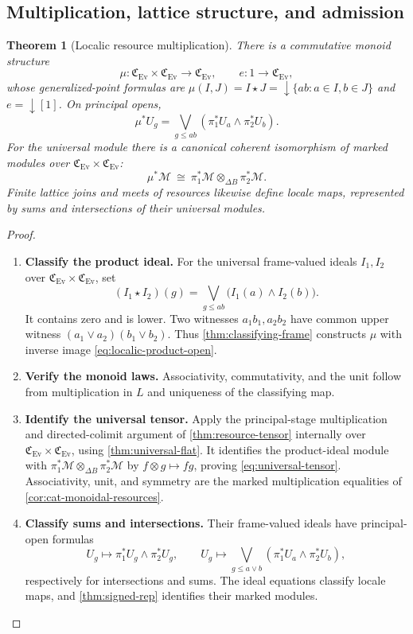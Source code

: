 \documentclass[11pt,a4paper]{article}
\numberwithin{algorithm}{section}
\numberwithin{equation}{section}
\newtheorem{theorem}{Theorem}[section]
\theoremstyle{definition}
\theoremstyle{remark}
\theoremstyle{plain}
\newcommand{\Ev}{{\operatorname{Ev}}}
\newcommand{\Cplx}{\mathfrak C_{\Ev}}
\theoremstyle{definition}
\theoremstyle{plain}
\begin{document}
\subsection{Multiplication, lattice structure, and admission}
\begin{theorem}[Localic resource multiplication]
\label{thm:localic-multiplication}
There is a commutative monoid structure
\[
 \mu:\Cplx\times\Cplx\to\Cplx,
 \qquad e:1\to\Cplx,
\]
whose generalized-point formulas are
$\mu(I,J)=I\star J=\downarrow\{ab:a\in I,b\in J\}$ and
$e=\downarrow[1]$. On principal opens,
\begin{equation}\label{eq:localic-product-open}
 \mu^*U_g
 =\bigvee_{g\le ab}
    (\pi_1^*U_a\wedge\pi_2^*U_b).
\end{equation}
For the universal module there is a canonical coherent
isomorphism of marked modules over $\Cplx\times\Cplx$:
\begin{equation}\label{eq:universal-tensor}
 \mu^*\mathscr M
 \ \cong\ \pi_1^*\mathscr M
     \otimes_{\Delta B}\pi_2^*\mathscr M.
\end{equation}
Finite lattice joins and meets of resources likewise define
locale maps, represented by sums and intersections of their
universal modules.
\end{theorem}
\begin{proof}\leavevmode
\begin{enumerate}[leftmargin=*,align=left]
\item \textbf{Classify the product ideal.}
For the universal frame-valued ideals $I_1,I_2$ over
$\Cplx\times\Cplx$, set
\[
 (I_1\star I_2)(g)=
 \bigvee_{g\le ab}\bigl(I_1(a)\wedge I_2(b)\bigr).
\]
It contains zero and is lower. Two witnesses $a_1b_1,a_2b_2$
have common upper witness $(a_1\vee a_2)(b_1\vee b_2)$.
Thus \cref{thm:classifying-frame} constructs $\mu$ with
inverse image \eqref{eq:localic-product-open}.

\item \textbf{Verify the monoid laws.}
Associativity, commutativity, and the unit follow from multiplication
in $L$ and uniqueness of the classifying map.

\item \textbf{Identify the universal tensor.}
Apply the principal-stage multiplication and directed-colimit
argument of \cref{thm:resource-tensor} internally over
$\Cplx\times\Cplx$, using \cref{thm:universal-flat}.
It identifies the product-ideal module with
$\pi_1^*\mathscr M\otimes_{\Delta B}\pi_2^*\mathscr M$
by $f\otimes g\mapsto fg$, proving \eqref{eq:universal-tensor}.
Associativity, unit, and symmetry are the marked multiplication
equalities of \cref{cor:cat-monoidal-resources}.

\item \textbf{Classify sums and intersections.}
Their frame-valued ideals have principal-open formulas
\[
 U_g\longmapsto\pi_1^*U_g\wedge\pi_2^*U_g,
 \qquad
 U_g\longmapsto\bigvee_{g\le a\vee b}
       (\pi_1^*U_a\wedge\pi_2^*U_b),
\]
respectively for intersections and sums. The ideal equations
classify locale maps, and \cref{thm:signed-rep} identifies their
marked modules.
\end{enumerate}
\end{proof}
\end{document}
